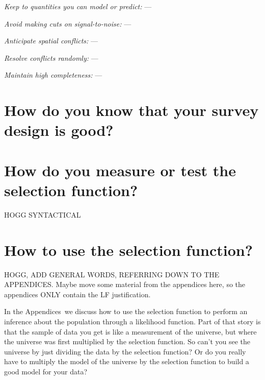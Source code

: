 \documentclass[modern]{aastex62}
\newcommand{\appendixnames}{Appendices}
\renewcommand{\paragraph}[1]{\medskip\noindent\textit{#1} ---}
\begin{document}
\paragraph{Keep to quantities you can model or predict:}

\paragraph{Avoid making cuts on signal-to-noise:}

\paragraph{Anticipate spatial conflicts:}

\paragraph{Resolve conflicts randomly:}

\paragraph{Maintain high completeness:}

\section{How do you know that your survey design is good?}\label{sec:verify}

\section{How do you measure or test the selection function?}\label{sec:estimate}

HOGG SYNTACTICAL

\section{How to use the selection function?}\label{sec:howto}

HOGG, ADD GENERAL WORDS, REFERRING DOWN TO THE APPENDICES. Maybe move
some material from the appendices here, so the appendices ONLY contain
the LF justification.

In the \appendixnames\ we discuss how to use the selection function
to perform an inference about the population through a likelihood
function.
Part of that story is that the sample of data you get is like a
measurement of the universe, but where the universe was first
multiplied by the selection function.
So can't you see the universe by just dividing the data by the
selection function?
Or do you really have to multiply the model of the universe by the
selection function to build a good model for your data?
\end{document}
